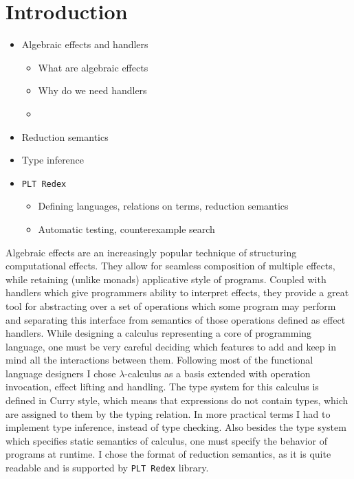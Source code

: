 \documentclass[inz, english, shortabstract]{iithesis}
\author         {Maciej Buszka}
\newcommand{\Redex}{\texttt{PLT Redex} }
\newcommand{\LC}{\(\lambda\)-calculus }
\begin{document}

\chapter{Introduction}
\begin{itemize}
  \item Algebraic effects and handlers
  \begin{itemize}
    \item What are algebraic effects
    \item Why do we need handlers
    \item 
  \end{itemize}
  
  \item Reduction semantics
  
  \item Type inference
  
  \item \Redex
  \begin{itemize}
    \item Defining languages, relations on terms, reduction semantics
    \item Automatic testing, counterexample search
  \end{itemize}
\end{itemize}

Algebraic effects \cite{Plotkin2003} are an increasingly popular technique of structuring computational effects.
They allow for seamless composition of multiple effects, while retaining (unlike monads) applicative style of programs.
Coupled with handlers \cite{Plotkin2013} which give programmers ability to interpret effects, they provide a great tool for abstracting over a set of operations which some program may perform and separating this interface from semantics of those operations defined as effect handlers.
While designing a calculus representing a core of programming language, one must be very careful deciding which features to add and keep in mind all the interactions between them.
Following most of the functional language designers I chose \LC as a basis extended with operation invocation, effect lifting and handling.
The type system for this calculus is defined in Curry style, which means that expressions do not contain types, which are assigned to them by the typing relation.
In more practical terms I had to implement type inference, instead of type checking.
Also besides the type system which specifies static semantics of calculus, one must specify the behavior of programs at runtime.
I chose the format of reduction semantics, as it is quite readable and is supported by \Redex library.
\end{document}
